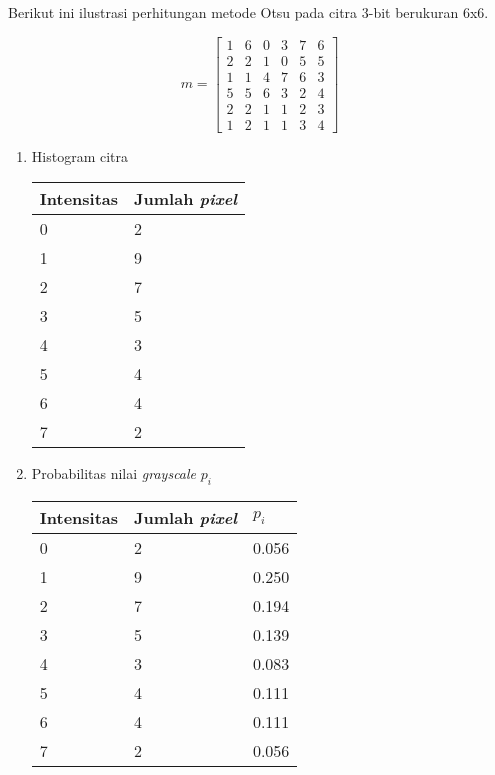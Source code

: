\documentclass[laporan.tex]{subfiles}
\begin{document}
Berikut ini ilustrasi perhitungan metode Otsu pada citra 3-bit berukuran 6x6.

\begin{equation*}
	m = \begin{bmatrix}
		1 & 6 & 0 & 3 & 7 & 6 \\
		2 & 2 & 1 & 0 & 5 & 5 \\
		1 & 1 & 4 & 7 & 6 & 3 \\
		5 & 5 & 6 & 3 & 2 & 4 \\
		2 & 2 & 1 & 1 & 2 & 3 \\
		1 & 2 & 1 & 1 & 3 & 4
	\end{bmatrix}
\end{equation*}

\begin{enumerate}

\item Histogram citra \\
\begin{tabular}{|l|l|}
\hline
Intensitas & Jumlah \emph{pixel} \\
\hline
0 & 2 \\
1 & 9 \\
2 & 7 \\
3 & 5 \\
4 & 3 \\
5 & 4 \\
6 & 4 \\
7 & 2 \\
\hline
\end{tabular}

\item Probabilitas nilai \emph{grayscale} $p_i$ \\
\begin{tabular}{|l|l|l|}
\hline
Intensitas & Jumlah \emph{pixel} & $p_i$ \\
\hline
0 & 2 & 0.056 \\
1 & 9 & 0.250 \\
2 & 7 & 0.194 \\
3 & 5 & 0.139 \\
4 & 3 & 0.083 \\
5 & 4 & 0.111 \\
6 & 4 & 0.111 \\
7 & 2 & 0.056 \\
\hline
\end{tabular}


\end{enumerate}
\end{document}
